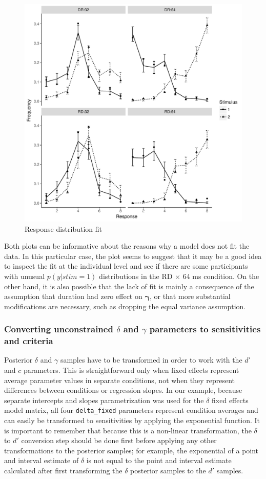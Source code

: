 \documentclass[a4paper,man,apacite,floatsintext]{apa6}
\newcommand{\code}[1]{\texttt{#1}}
\begin{document}
\begin{figure}[H]
  \centering
  \includegraphics[width=.8\linewidth]{response_fit.pdf}
  \caption{Response distribution fit}
  \label{fig:4}
\end{figure}

Both plots can be informative about the reasons why a model does not
fit the data. In this particular case, the plot seems to suggest that
it may be a good idea to inspect the fit at the individual level and
see if there are some participants with unusual $p(y|stim=1)$
distributions in the RD $\times$ 64 ms condition. On the other hand,
it is also possible that the lack of fit is mainly a consequence of
the assumption that duration had zero effect on $\bm{\gamma}$, or that
more substantial modifications are necessary, such as dropping the
equal variance assumption.

\subsubsection{Converting unconstrained $\delta$ and $\gamma$
  parameters to sensitivities and criteria}

Posterior $\delta$ and $\gamma$ samples have to be transformed in
order to work with the $d'$ and $c$ parameters. This is
straightforward only when fixed effects represent average parameter
values in separate conditions, not when they represent differences
between conditions or regression slopes. In our example, because
separate intercepts and slopes parametrization was used for the
$\delta$ fixed effects model matrix, all four \code{delta\_fixed}
parameters represent condition averages and can easily be transformed
to sensitivities by applying the exponential function. It is important
to remember that because this is a non-linear transformation, the
$\delta$ to $d'$ conversion step should be done first before applying
any other transformations to the posterior samples; for example, the
exponential of a point and interval estimate of $\delta$ is not equal
to the point and interval estimate calculated after first transforming
the $\delta$ posterior samples to the $d'$ samples.
\end{document}
